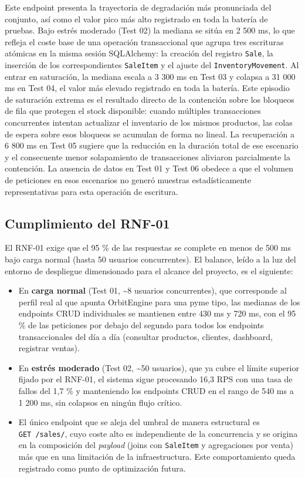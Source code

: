 Este endpoint presenta la trayectoria de degradación más pronunciada del conjunto, así como el valor pico más alto registrado en toda la batería de pruebas. Bajo estrés moderado (Test 02) la mediana se sitúa en 2 500 ms, lo que refleja el coste base de una operación transaccional que agrupa tres escrituras atómicas en la misma sesión SQLAlchemy: la creación del registro \texttt{Sale}, la inserción de los correspondientes \texttt{SaleItem} y el ajuste del \texttt{InventoryMovement}. Al entrar en saturación, la mediana escala a 3 300 ms en Test 03 y colapsa a 31 000 ms en Test 04, el valor más elevado registrado en toda la batería. Este episodio de saturación extrema es el resultado directo de la contención sobre los bloqueos de fila que protegen el stock disponible: cuando múltiples transacciones concurrentes intentan actualizar el inventario de los mismos productos, las colas de espera sobre esos bloqueos se acumulan de forma no lineal. La recuperación a 6 800 ms en Test 05 sugiere que la reducción en la duración total de ese escenario y el consecuente menor solapamiento de transacciones aliviaron parcialmente la contención. La ausencia de datos en Test 01 y Test 06 obedece a que el volumen de peticiones en esos escenarios no generó muestras estadísticamente representativas para esta operación de escritura.

\subsection{Cumplimiento del RNF-01}\label{cumplimiento-del-rnf-01}

El RNF-01 exige que el 95 \% de las respuestas se complete en menos de 500 ms bajo carga normal (hasta 50 usuarios concurrentes). El balance, leído a la luz del entorno de despliegue dimensionado para el alcance del proyecto, es el siguiente:

\begin{itemize}
\tightlist
\item
  En \textbf{carga normal} (Test 01, \textasciitilde8 usuarios concurrentes), que corresponde al perfil real al que apunta OrbitEngine para una pyme tipo, las medianas de los endpoints CRUD individuales se mantienen entre 430 ms y 720 ms, con el 95 \% de las peticiones por debajo del segundo para todos los endpoints transaccionales del día a día (consultar productos, clientes, dashboard, registrar ventas).
\item
  En \textbf{estrés moderado} (Test 02, \textasciitilde50 usuarios), que ya cubre el límite superior fijado por el RNF-01, el sistema sigue procesando 16,3 RPS con una tasa de fallos del 1,7 \% y manteniendo los endpoints CRUD en el rango de 540 ms a 1 200 ms, sin colapsos en ningún flujo crítico.
\item
  El único endpoint que se aleja del umbral de manera estructural es \texttt{GET\ /sales/}, cuyo coste alto es independiente de la concurrencia y se origina en la composición del \emph{payload} (joins con \texttt{SaleItem} y agregaciones por venta) más que en una limitación de la infraestructura. Este comportamiento queda registrado como punto de optimización futura.
\end{itemize}

